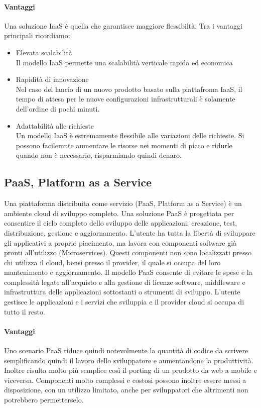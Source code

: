 \paragraph{Vantaggi}
Una soluzione IaaS è quella che garantisce maggiore flessibiltà. Tra i vantaggi principali ricordiamo:
\begin{itemize}
	\item  Elevata scalabilità \\
	Il modello IaaS permette una scalabilità verticale rapida ed economica
	\item Rapidità di innovazione \\
	Nel caso del lancio di un nuovo prodotto basato sulla piattafroma IaaS, il tempo di attesa per le nuove configurazioni infrastrutturali è solamente dell'ordine di pochi minuti.
	\item Adattabilità alle richieste \\
	Un modello IaaS è estremamente flessibile alle variazioni delle richieste. Si possono facilemnte aumentare le risorse nei momenti di picco e ridurle quando non è necessario, risparmiando quindi denaro.
	
\end{itemize}
\subsection{PaaS, Platform as a Service}
Una piattaforma distribuita come servizio (PaaS, Platform as a Service) è un ambiente cloud di sviluppo completo. Una soluzione PaaS è progettata per consentire il ciclo completo dello sviluppo delle applicazioni: creazione, test, distribuzione, gestione e aggiornamento. L'utente ha tutta la libertà di sviluppare gli applicativi a proprio piacimento, ma lavora con componenti software già pronti all'utilizzo (Microservices). Questi componenti non sono localizzati presso chi utilizza il cloud, bensì presso il provider, il quale si occupa del loro mantenimento e aggiornamento. Il modello PaaS consente di evitare le spese e la complessità legate all'acquisto e alla gestione di licenze software, middleware e infrastruttura delle applicazioni sottostanti o strumenti di sviluppo. L'utente gestisce le applicazioni e i servizi che sviluppia e il provider cloud si occupa di tutto il resto.
\paragraph{Vantaggi}
Uno scenario PaaS riduce quindi notevolmente la quantità di codice da scrivere semplificando quindi il lavoro dello sviluppatore e aumentandone la produttività. Inoltre risulta molto più semplice così il porting di un prodotto da web a mobile e viceversa. Componenti molto complessi e costosi possono inoltre essere messi a disposizione, con un utilizzo limitato, anche per sviluppatori che altrimenti non potrebbero permetterselo. 

